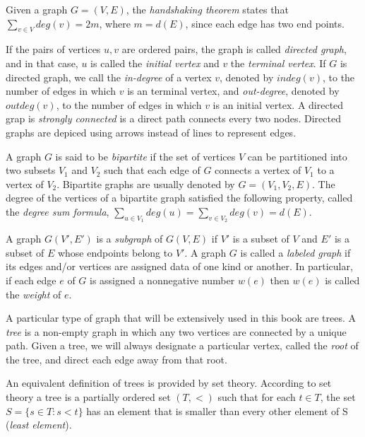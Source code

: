 \begin{example}
Given a graph $G=(V,E)$, the \emph{handshaking theorem} states that $\sum_{v \in V} deg(v) = 2 m$, where $m = d(E)$, since each edge has two end points.
\end{example}

If the pairs of vertices $u, v$ are ordered pairs, the graph is called \emph{directed graph}, and in that case, $u$ is called the \emph{initial vertex} and $v$ the \emph{terminal vertex}. If $G$ is directed graph, we call the \emph{in-degree} of a vertex $v$, denoted by $indeg(v)$, to the number of edges in which $v$ is an terminal vertex, and \emph{out-degree}, denoted by $outdeg(v)$, to the number of edges in which $v$ is an initial vertex. A directed grap is \emph{strongly connected} is a direct path connects every two nodes. Directed graphs are depiced using arrows instead of lines to represent edges.

A graph $G$ is said to be \emph{bipartite} if the set of vertices $V$ can be partitioned into two subsets $V_1$ and $V_2$ such that each edge of $G$ connects a vertex of $V_1$ to a vertex of $V_2$. Bipartite graphs are usually denoted by $G=(V_1, V_2, E)$. The degree of the vertices of a bipartite graph satisfied the following property, called the \emph{degree sum formula}, $\sum_{u \in V_1} deg(u) = \sum_{v \in V_2} deg(v) = d(E)$.

A graph $G(V',E')$ is a \emph{subgraph} of $G(V,E)$ if $V'$ is a subset of $V$ and $E'$ is a subset of $E$ whose endpoints belong to $V'$. A graph $G$ is called a \emph{labeled graph} if its edges and/or vertices are assigned data of one kind or another. In particular, if each edge $e$ of $G$ is assigned a nonnegative number $w(e)$ then $w(e)$ is called the \emph{weight} of $e$.

A particular type of graph that will be extensively used in this book are trees. A \emph{tree} is a non-empty graph in which any two vertices are connected by a unique path. Given a tree, we will always designate a particular vertex, called the \emph{root} of the tree, and direct each edge away from that root.

\begin{example}
An equivalent definition of trees is provided by set theory. According to set theory a tree is a partially ordered set $(T, <)$ such that for each $t \in T$, the set $S = \{ s \in T : s < t \}$ has an element that is smaller than every other element of S (\emph{least element}).
\end{example}


